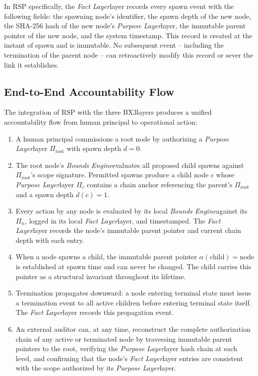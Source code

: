 \documentclass[12pt]{article}
\def\bxthree{BX3}
\def\purpose{\textit{Purpose Layer}}
\def\bounds{\textit{Bounds Engine}}
\def\fact{\textit{Fact Layer}}
\begin{document}
In RSP specifically, the \fact layer records every spawn event with the following fields: the spawning node's identifier, the spawn depth of the new node, the SHA-256 hash of the new node's \purpose layer, the immutable parent pointer of the new node, and the system timestamp. This record is created at the instant of spawn and is immutable. No subsequent event -- including the termination of the parent node -- can retroactively modify this record or sever the link it establishes.

\subsection{End-to-End Accountability Flow}

The integration of RSP with the three \bxthree layers produces a unified accountability flow from human principal to operational action:

\begin{enumerate}
    \item A human principal commissions a root node by authorizing a \purpose layer $\Pi_{\text{root}}$ with spawn depth $d = 0$.
    \item The root node's \bounds evaluates all proposed child spawns against $\Pi_{\text{root}}$'s scope signature. Permitted spawns produce a child node $c$ whose \purpose layer $\Pi_c$ contains a chain anchor referencing the parent's $\Pi_{\text{root}}$ and a spawn depth $d(c) = 1$.
    \item Every action by any node is evaluated by its local \bounds against its $\Pi_n$, logged in its local \fact layer, and timestamped. The \fact layer records the node's immutable parent pointer and current chain depth with each entry.
    \item When a node spawns a child, the immutable parent pointer $\alpha(\text{child}) = \text{node}$ is established at spawn time and can never be changed. The child carries this pointer as a structural invariant throughout its lifetime.
    \item Termination propagates downward: a node entering terminal state must issue a termination event to all active children before entering terminal state itself. The \fact layer records this propagation event.
    \item An external auditor can, at any time, reconstruct the complete authorization chain of any active or terminated node by traversing immutable parent pointers to the root, verifying the \purpose layer hash chain at each level, and confirming that the node's \fact layer entries are consistent with the scope authorized by its \purpose layer.
\end{enumerate}
\end{document}

